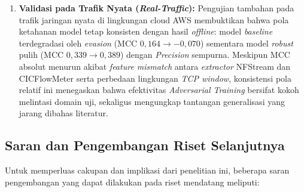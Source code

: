 \documentclass[11pt, a4paper]{article}
\begin{document}
\begin{enumerate}
    \item \textbf{Validasi pada Trafik Nyata (\textit{Real-Traffic}):} Pengujian tambahan pada trafik jaringan nyata di lingkungan cloud AWS membuktikan bahwa pola ketahanan model tetap konsisten dengan hasil \textit{offline}: model \textit{baseline} terdegradasi oleh \textit{evasion} (MCC $0{,}164 \rightarrow -0{,}070$) sementara model \textit{robust} pulih (MCC $0{,}339 \rightarrow 0{,}389$) dengan \textit{Precision} sempurna. Meskipun MCC absolut menurun akibat \textit{feature mismatch} antara \textit{extractor} NFStream dan CICFlowMeter serta perbedaan lingkungan \textit{TCP window}, konsistensi pola relatif ini menegaskan bahwa efektivitas \textit{Adversarial Training} bersifat kokoh melintasi domain uji, sekaligus mengungkap tantangan generalisasi yang jarang dibahas literatur.
\end{enumerate}

\subsection{Saran dan Pengembangan Riset Selanjutnya}
Untuk memperluas cakupan dan implikasi dari penelitian ini, beberapa saran pengembangan yang dapat dilakukan pada riset mendatang meliputi:
\end{document}
